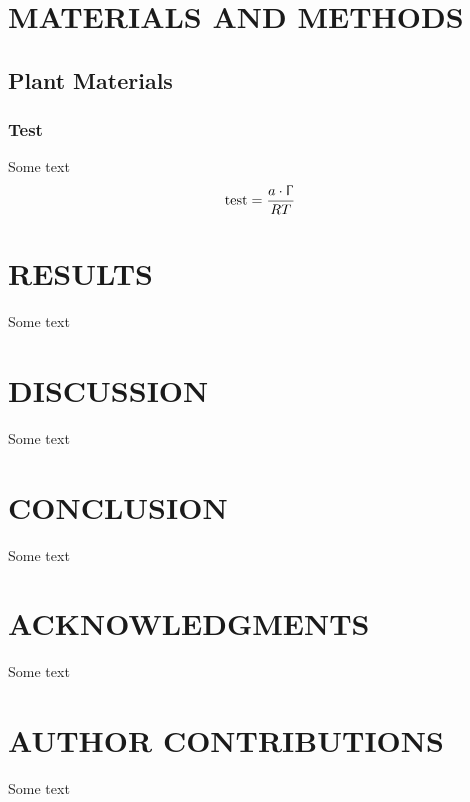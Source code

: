 \documentclass[letterpaper,12pt]{article}
\begin{document}
\section{MATERIALS AND METHODS}
\subsection{Plant Materials}
\subsubsection{Test}
\par Some text
\begin{equation}
	\text{test} = \dfrac{a \cdot \Upgamma}{RT}
\end{equation}




\section{RESULTS}
\par Some text




\section{DISCUSSION}
\par Some text




\section{CONCLUSION}
\par Some text




\clearpage
\section*{ACKNOWLEDGMENTS}
\par Some text




\section*{AUTHOR CONTRIBUTIONS}
\par Some text
\end{document}

